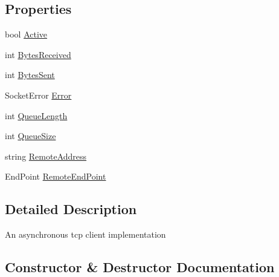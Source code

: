 \subsection*{Properties}
\begin{DoxyCompactItemize}
\item 
bool \hyperlink{classOTA_1_1Sockets_1_1Connection_a2b6588a22e550fe70707398645103e2e}{Active}
\item 
int \hyperlink{classOTA_1_1Sockets_1_1Connection_a69ee1dc2d865434d38efc54332f88aa3}{Bytes\+Received}
\item 
int \hyperlink{classOTA_1_1Sockets_1_1Connection_a785f45619f1d48bdbf4915f6d87d4572}{Bytes\+Sent}
\item 
Socket\+Error \hyperlink{classOTA_1_1Sockets_1_1Connection_a520c92cb15dcbda21a1fa21e2d2691a0}{Error}
\item 
int \hyperlink{classOTA_1_1Sockets_1_1Connection_a6877a4159f76ae1f48bddf93e81d8d64}{Queue\+Length}
\item 
int \hyperlink{classOTA_1_1Sockets_1_1Connection_a11bbffcd9c01d0abd3a238c3038e1ae0}{Queue\+Size}
\item 
string \hyperlink{classOTA_1_1Sockets_1_1Connection_a5b3fbccddb2ac7b5856c0cb3a6a6e60c}{Remote\+Address}
\item 
End\+Point \hyperlink{classOTA_1_1Sockets_1_1Connection_a0b05515289b04cf1de67b7d1f8863b94}{Remote\+End\+Point}
\end{DoxyCompactItemize}


\subsection{Detailed Description}
An asynchronous tcp client implementation 



\subsection{Constructor \& Destructor Documentation}
\hypertarget{classOTA_1_1Sockets_1_1Connection_a346f4774f29e17e14e9b39fa9e2165e3}{}
